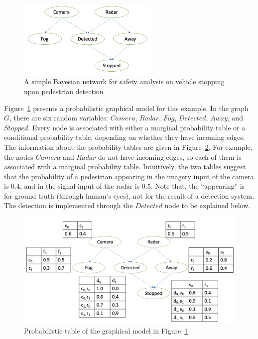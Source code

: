 

\begin{figure}[!htbp]
    \centering
    \includegraphics[width=0.6\textwidth]{images/graphical models/graphicalmodel.png}
    \caption{A simple Bayesian network for safety analysis on vehicle stopping upon pedestrian detection}
    \label{fig:graphicalmodel}
\end{figure}

Figure~\ref{fig:graphicalmodel} presents a probabilistic graphical model for this example. In the graph $G$, there are six random variables: $Camera$, $Radar$, $Fog$, $Detected$, $Away$, and $Stopped$. Every node is associated with either a marginal probability table or a conditional probability table, depending on whether they have incoming edges. The information about the probability tables are given in Figure~\ref{fig:cameratables}. For example, the nodes $Camera$ and $Radar$ do not have incoming edges, so each of them is associated with a marginal probability table. Intuitively, the two tables suggest that the probability of a pedestrian appearing in the imagery input of the camera is $0.4$, and in the signal input of the radar is $0.5$. Note that, the ``appearing'' is for ground truth (through human's eyes), not for the result of a detection system. The detection is implemented through the $Detected$ node to be explained below. 




\begin{figure}[!htbp]
    \centering
    \includegraphics[width=\textwidth]{images/graphical models/cameramodel.png}
    \caption{Probabilistic table of the graphical model in Figure~\ref{fig:graphicalmodel}}
    \label{fig:cameratables}
\end{figure}


